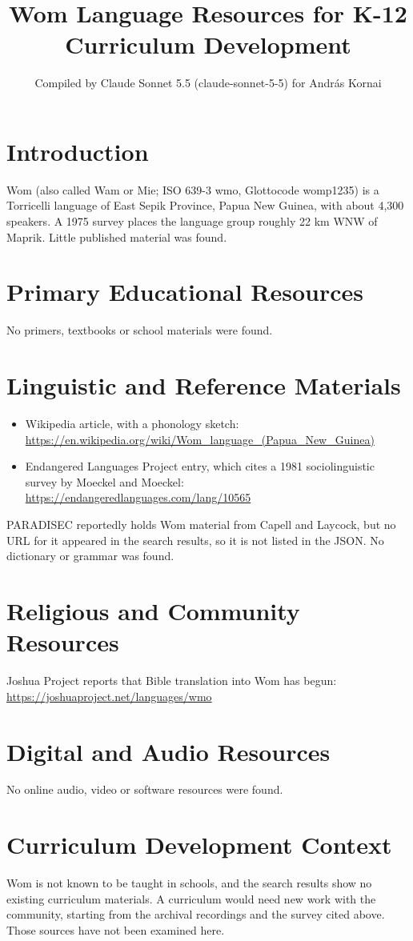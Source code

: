 \documentclass[12pt]{article}
\title{Wom Language Resources for K-12 Curriculum Development}
\author{Compiled by Claude Sonnet 5.5 (claude-sonnet-5-5) for Andr\'as Kornai}
\date{}
\begin{document}
\maketitle

\section{Introduction}
Wom (also called Wam or Mie; ISO 639-3 wmo, Glottocode womp1235) is a Torricelli language of East Sepik Province, Papua New Guinea, with about 4,300 speakers. A 1975 survey places the language group roughly 22 km WNW of Maprik. Little published material was found.

\section{Primary Educational Resources}
No primers, textbooks or school materials were found.

\section{Linguistic and Reference Materials}
\begin{itemize}
\item Wikipedia article, with a phonology sketch: \url{https://en.wikipedia.org/wiki/Wom_language_(Papua_New_Guinea)}
\item Endangered Languages Project entry, which cites a 1981 sociolinguistic survey by Moeckel and Moeckel: \url{https://endangeredlanguages.com/lang/10565}
\end{itemize}
PARADISEC reportedly holds Wom material from Capell and Laycock, but no URL for it appeared in the search results, so it is not listed in the JSON. No dictionary or grammar was found.

\section{Religious and Community Resources}
Joshua Project reports that Bible translation into Wom has begun: \url{https://joshuaproject.net/languages/wmo}

\section{Digital and Audio Resources}
No online audio, video or software resources were found.

\section{Curriculum Development Context}
Wom is not known to be taught in schools, and the search results show no existing curriculum materials. A curriculum would need new work with the community, starting from the archival recordings and the survey cited above. Those sources have not been examined here.
\end{document}
